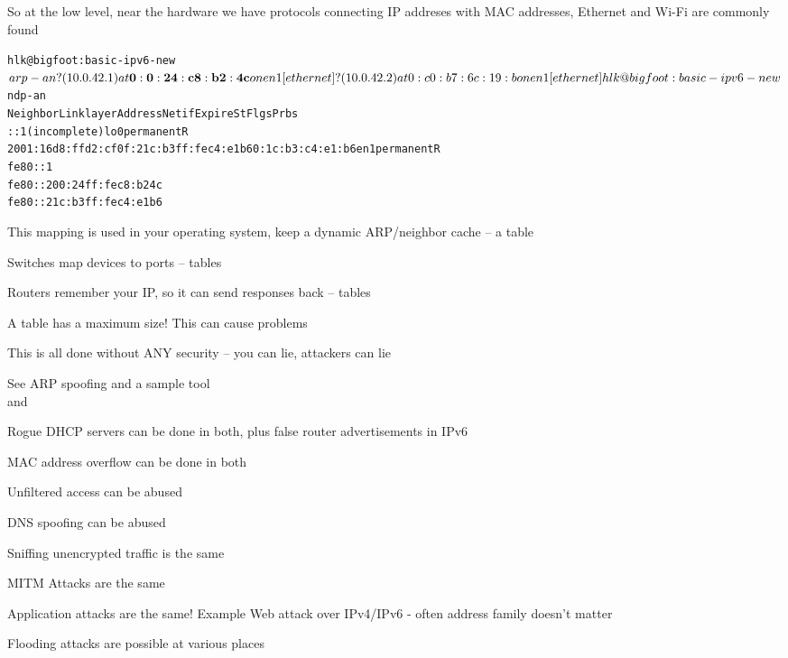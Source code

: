 \documentclass[Screen16to9,17pt]{foils}
\begin{document}

So at the low level, near the hardware we have protocols connecting IP addreses with MAC addresses, Ethernet and Wi-Fi are commonly found

\begin{alltt}
\small
hlk@bigfoot:basic-ipv6-new$ arp -an
? (10.0.42.1) at{\bf 0:0:24:c8:b2:4c} on en1 [ethernet]
? (10.0.42.2) at 0:c0:b7:6c:19:b on en1 [ethernet]

hlk@bigfoot:basic-ipv6-new$ ndp -an
Neighbor                      Linklayer Address  Netif Expire    St Flgs Prbs
::1                           (incomplete)         lo0 permanent R
2001:16d8:ffd2:cf0f:21c:b3ff:fec4:e1b6 0:1c:b3:c4:e1:b6 en1 permanent R
fe80::1%lo0                   (incomplete)         lo0 permanent R
fe80::200:24ff:fec8:b24c%en1 {\bf 0:0:24:c8:b2:4c}      en1 8h54m51s  S  R
fe80::21c:b3ff:fec4:e1b6%en1  0:1c:b3:c4:e1:b6     en1 permanent R
\end{alltt}


\begin{list2}
\item This mapping is used in your operating system, keep a dynamic ARP/neighbor cache -- a table
\item Switches map devices to ports -- tables
\item Routers remember your IP, so it can send responses back -- tables
\item A table has a maximum size! This can cause problems {\myalert}
\item This is all done without ANY security -- you can lie, attackers can lie
\item See ARP spoofing and a sample tool  \\
and 
\end{list2}



\begin{list2}
\item Rogue DHCP servers can be done in both, plus false router advertisements in IPv6
\item MAC address overflow can be done in both
\item Unfiltered access can be abused
\item DNS spoofing can be abused
\item Sniffing unencrypted traffic is the same
\item MITM Attacks are the same {\myalert}
\item Application attacks are the same! Example Web attack over IPv4/IPv6 - often address family doesn't matter {\myalert}
\item Flooding attacks are possible at various places
\end{list2}
\end{document}
